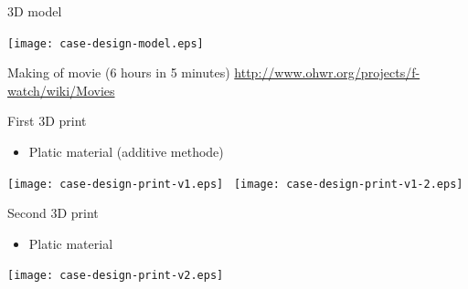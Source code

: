 \documentclass[compress,red]{beamer}
\begin{document}

\begin{frame}{3D model}

  \begin{center}
    \texttt{[image: case-design-model.eps]}
  \end{center}

  Making of movie (6 hours in 5 minutes)
  \url{http://www.ohwr.org/projects/f-watch/wiki/Movies}

  \note[item]{}

\end{frame}

\begin{frame}{First 3D print}

  \begin{itemize}
  \item Platic material (additive methode)
  \end{itemize}

  \begin{center}
    \texttt{[image: case-design-print-v1.eps]}~
    \texttt{[image: case-design-print-v1-2.eps]}
  \end{center}


\end{frame}

\begin{frame}{Second 3D print}

  \begin{itemize}
  \item Platic material
  \end{itemize}

  \begin{center}
    \texttt{[image: case-design-print-v2.eps]}
  \end{center}


\end{frame}
\end{document}
